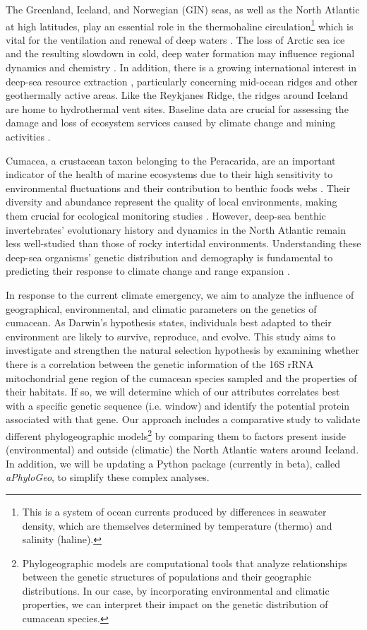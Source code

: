 The Greenland, Iceland, and Norwegian (GIN) seas, as well as the North Atlantic at high latitudes, play an essential role in the {thermohaline circulation}\footnote{This is a system of ocean currents produced by differences in seawater density, which are themselves determined by temperature (thermo) and salinity (haline).} which is vital for the ventilation and renewal of deep waters \citep{johannessen_relationship_1994, talley2013closure}. The loss of Arctic sea ice and the resulting slowdown in cold, deep water formation may influence regional dynamics and chemistry \citep{meisner_prefacebiodiversity_2018}. In addition, there is a growing international interest in deep-sea resource extraction \citep{mengerink_call_2014}, particularly concerning mid-ocean ridges and other geothermally active areas. Like the Reykjanes Ridge, the ridges around Iceland are home to hydrothermal vent sites. Baseline data are crucial for assessing the damage and loss of ecosystem services caused by climate change and mining activities \citep{meisner_prefacebiodiversity_2018}. 

Cumacea, a crustacean taxon belonging to the Peracarida, are an important indicator of the health of marine ecosystems due to their high sensitivity to environmental fluctuations \citep{stransky_diversity_2010} and their contribution to benthic foods webs \citep{rehm2009cumacea}. Their diversity and abundance represent the quality of local environments, making them crucial for ecological monitoring studies \citep{hessler1967faunal}. However, deep-sea benthic invertebrates' evolutionary history and dynamics in the North Atlantic remain less well-studied than those of rocky intertidal environments. Understanding these deep-sea organisms' genetic distribution and demography is fundamental to predicting their response to climate change and range expansion \citep{jennings_phylogeographic_2014}. 

In response to the current climate emergency, we aim to analyze the influence of geographical, environmental, and climatic parameters on the genetics of cumacean. As Darwin's hypothesis states, individuals best adapted to their environment are likely to survive, reproduce, and evolve. This study aims to investigate and strengthen the natural selection hypothesis by examining whether there is a correlation between the genetic information of the 16S rRNA mitochondrial gene region of the cumacean species sampled and the properties of their habitats. If so, we will determine which of our attributes correlates best with a specific genetic sequence (i.e. window) and identify the potential protein associated with that gene. Our approach includes a comparative study to validate different {phylogeographic models}\footnote{Phylogeographic models are computational tools that analyze relationships between the genetic structures of populations and their geographic distributions. In our case, by incorporating environmental and climatic properties, we can interpret their impact on the genetic distribution of cumacean species.} by comparing them to factors present inside (environmental) and outside (climatic) the North Atlantic waters around Iceland. In addition, we will be updating a Python package (currently in beta), called \textit{aPhyloGeo}, to simplify these complex analyses.

